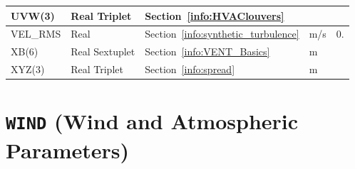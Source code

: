 \documentclass[11pt]{book}
\begin{document}
\begin{longtable}{@{\extracolsep{\fill}}|l|l|l|l|l|}
{\ct UVW(3) }               & Real Triplet      & Section~\ref{info:HVAClouvers}                            &               &                     \\ \hline
{\ct VEL\_RMS}              & Real              & Section~\ref{info:synthetic_turbulence}                   & m/s           & 0.                  \\ \hline
{\ct XB(6) }                & Real Sextuplet    & Section~\ref{info:VENT_Basics}                            & m             &                     \\ \hline
{\ct XYZ(3) }               & Real Triplet      & Section~\ref{info:spread}                                 & m             &                     \\ \hline
\end{longtable}


\vspace{\baselineskip}



\section{\texorpdfstring{{\tt WIND}}{WIND} (Wind and Atmospheric Parameters)}
\end{document}
